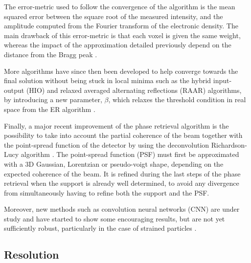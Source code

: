 The error-metric used to follow the convergence of the algorithm is the mean squared error between the square root of the measured intensity, and the amplitude computed from the Fourier transform of the electronic density.
The main drawback of this error-metric is that each voxel is given the same weight, whereas the impact of the approximation detailed previously depend on the distance from the Bragg peak \parencite{Godard2021}.


More algorithms have since then been developed to help converge towards the final solution without being stuck in local minima such as the hybrid input-output (HIO) and relaxed averaged alternating reflections (RAAR) algorithms, by introducing a new parameter, $\beta$, which relaxes the threshold condition in real space from the ER algorithm \parencite{Marchesini2003, Luke2005, Marchesini2007}.

Finally, a major recent improvement of the phase retrieval algorithm is the possibility to take into account the partial coherence of the beam \parencite{Sinha1998, Vartanyants2001, Williams2007, Whitehead2009, Nugent2010, ChenBo2012} together with the point-spread function of the detector by using the deconvolution Richardson-Lucy algorithm \parencite{Richardson1972, Lucy1974, Fish1995, Clark2012}.
The point-spread function (PSF) must first be approximated with a 3D Gaussian, Lorentzian or pseudo-voigt shape, depending on the expected coherence of the beam.
It is refined during the last steps of the phase retrieval when the support is already well determined, to avoid any divergence from simultaneously having to refine both the support and the PSF.

Moreover, new methods such as convolution neural networks (CNN) are under study and have started to show some encouraging results, but are not yet sufficiently robust, particularly in the case of strained particles \parencite{Cherukara2018, Shen2019, Chan2021, Kim2021a, Wu2021a}.

\subsection{Resolution}

